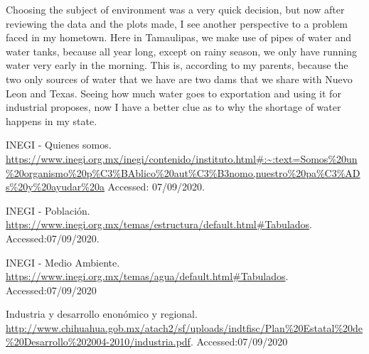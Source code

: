 \documentclass{article}
\begin{document}
Choosing the subject of environment was a very quick decision, but now after reviewing the data and the plots made, I see another perspective to a problem faced in my hometown. Here in Tamaulipas, we make use of pipes of water and water tanks, because all year long, except on rainy season, we only have running water very early in the morning. This is, according to my parents, because the two only sources of water that we have are two dams that we share with Nuevo Leon and Texas. Seeing how much water goes to exportation and using it for industrial proposes, now I have a better clue as to why the shortage of water happens in my state.\\

\begin{thebibliography}{4}

 INEGI - Quienes somos. \url{https://www.inegi.org.mx/inegi/contenido/instituto.html#:~:text=Somos\%20un\%20organismo\%20p\%C3\%BAblico\%20aut\%C3\%B3nomo,nuestro\%20pa\%C3\%ADs\%20y\%20ayudar\%20a} Accessed: 07/09/2020.

 INEGI - Poblaci\'on. \url{https://www.inegi.org.mx/temas/estructura/default.html\#Tabulados}. Accessed:07/09/2020.

 INEGI - Medio Ambiente. \url{https://www.inegi.org.mx/temas/agua/default.html#Tabulados}. Accessed:07/09/2020

 Industria y desarrollo enon\'omico y regional. \url{http://www.chihuahua.gob.mx/atach2/sf/uploads/indtfisc/Plan\%20Estatal\%20de\%20Desarrollo\%202004-2010/industria.pdf}. Accessed:07/09/2020

\end{thebibliography}
 
\end{document}
